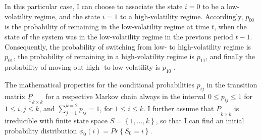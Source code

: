 \documentclass[a4paper,11pt,english]{article}
\begin{document}
				In this particular case, I can choose to associate the state $i = 0$ to be a low-volatility regime, and the state $i=1$ to a
				high-volatility regime. Accordingly, $p_{00}$ is the probability of remaining in the low-volatility regime at time $t$, when the state of 
				the system was in the low-volatility regime in the previous period $t-1$. Consequently, the probability of switching from low- to 
				high-volatility regime is $p_{01}$, the probability of remaining in a high-volatility regime is $p_{11}$, and finally the probability of 
				moving out high- to low-volatility is $p_{10}$ . 

				The mathematical properties for the conditional probabilities $p_{ij}$ in the transition matrix $\underline{\underline{P}}_{k \times k}$ 
				for a respective Markov chain always in the interval $0\leq p_{ij}\leq 1$ for $1\leq i,j \leq k$, and $\sum_{j=1}^{k=2} p_{ij} = 1$, for 
				$1 \leq i \leq k$. I further assume that $\underline{\underline{P}}_{k \times k}$ is irreducible with finite state space 
				$S = \left\{1, \ldots, k \right\}$, so that I can find an initial probability distribution $\phi_0(i) = Pr\left\{S_0=i \right\}$.  
\end{document}
